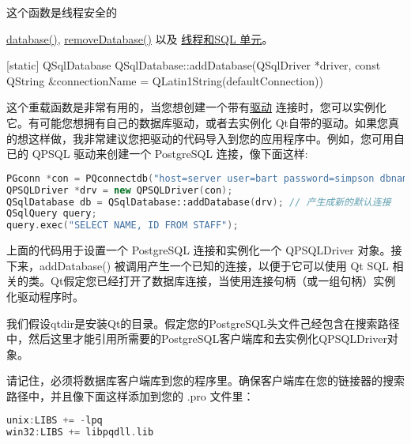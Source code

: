 \begin{notice}
这个函数是线程安全的
\end{notice}


\begin{seeAlso}
\href{https://github.com/QtDocumentCN/QtDocumentCN/blob/master/Src/S/QSqlDatabase/QSqlDatabase.md#static-qsqldatabase-qsqldatabasedatabaseconst-qstring-connectionname--qlatin1stringdefaultconnection-bool-open--true}{database()}, \href{https://github.com/QtDocumentCN/QtDocumentCN/blob/master/Src/S/QSqlDatabase/QSqlDatabase.md#static-void-qsqldatabaseremovedatabaseconst-qstring-connectionname}{removeDatabase()} 以及 \href{https://doc.qt.io/qt-5/threads-modules.html#threads-and-the-sql-module}{ 线程和SQL 单元}。
\end{seeAlso}


[static] QSqlDatabase QSqlDatabase::addDatabase(QSqlDriver *driver, const QString \&connectionName = QLatin1String(defaultConnection))

这个重载函数是非常有用的，当您想创建一个带有\href{https://doc.qt.io/qt-5/qsqldriver.html}{驱动} 连接时，您可以实例化它。有可能您想拥有自己的数据库驱动，或者去实例化 Qt自带的驱动。如果您真的想这样做，我非常建议您把驱动的代码导入到您的应用程序中。例如，您可用自已的 QPSQL 驱动来创建一个 PostgreSQL 连接，像下面这样:

\begin{lstlisting}[language=C++]
PGconn *con = PQconnectdb("host=server user=bart password=simpson dbname=springfield");
QPSQLDriver *drv = new QPSQLDriver(con);
QSqlDatabase db = QSqlDatabase::addDatabase(drv); // 产生成新的默认连接
QSqlQuery query;
query.exec("SELECT NAME, ID FROM STAFF");	
\end{lstlisting}

上面的代码用于设置一个 PostgreSQL 连接和实例化一个 QPSQLDriver 对象。接下来，addDatabase() 被调用产生一个已知的连接，以便于它可以使用 Qt SQL 相关的类。Qt假定您已经打开了数据库连接，当使用连接句柄（或一组句柄）实例化驱动程序时。

\begin{notice}
我们假设qtdir是安装Qt的目录。假定您的PostgreSQL头文件己经包含在搜索路径中，然后这里才能引用所需要的PostgreSQL客户端库和去实例化QPSQLDriver对象。
\end{notice}



请记住，必须将数据库客户端库到您的程序里。确保客户端库在您的链接器的搜索路径中，并且像下面这样添加到您的 .pro 文件里：

\begin{lstlisting}[language=C++]
unix:LIBS += -lpq
win32:LIBS += libpqdll.lib
\end{lstlisting}


